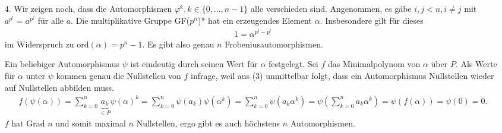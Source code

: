\begin{solution}
\begin{itemize}
    \item[4.] Wir zeigen noch, dass die Automorphismen $\varphi^k, k \in \{0, ..., n-1\}$ alle verschieden sind. Angenommen, es gäbe $i, j < n, i \neq j$ mit $a^{p^i} = a^{p^j}$ für alle $a.$ Die multiplikative Gruppe GF($p^n$)* hat ein erzeugendes Element $\alpha.$ Insbesondere gilt für dieses
    \begin{align*}
        1 = \alpha^{p^j - p^i}
    \end{align*}
    im Widerspruch zu $\mathrm{ord}(\alpha) = p^n - 1$. Es gibt also genau $n$ Frobeniusautomorphismen.

    Ein beliebiger Automorphismus $\psi$ ist eindeutig durch seinen Wert für $\alpha$ festgelegt. Sei $f$ das Minimalpolynom von $\alpha$ über $P.$ Als Werte für $\alpha$ unter $\psi$ kommen genau die Nullstellen von $f$ infrage, weil aus (3) unmittelbar folgt, dass ein Automorphismus Nullstellen wieder auf Nullstellen abbilden muss.
    \begin{align*}
      f(\psi(\alpha)) = \sum_{k=0}^n\underbrace{a_k}_{\in P}\psi(\alpha)^k =
      \sum_{k=0}^n\psi(a_k)\psi(\alpha^k) = \sum_{k=0}^n\psi(a_k\alpha^k) =
      \psi(\sum_{k=0}^na_k\alpha^k) = \psi(f(\alpha)) = \psi(0) = 0.
    \end{align*} $f$ hat Grad $n$ und somit maximal $n$ Nullstellen, ergo gibt es auch höchstens $n$ Automorphismen.
  \end{itemize}
\end{solution}
